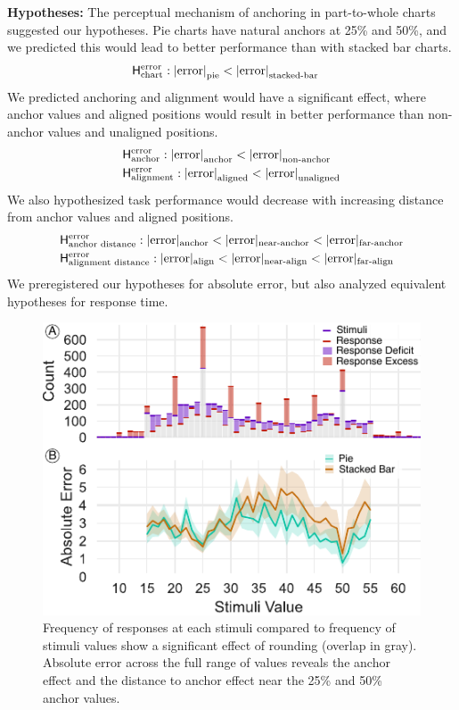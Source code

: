 \documentclass[preprint]{vgtc}               %
\newcommand{\FlatCircledText}[1]{\smash{\CircledText{#1}}}
\begin{document}
\textbf{Hypotheses:}
The perceptual mechanism of anchoring in part-to-whole charts suggested our hypotheses. 
Pie charts have  natural anchors at 25\% and 50\%, and we predicted this would lead to better performance than with stacked bar charts.
\begin{align}
    &\mathsf{H}^\text{error}_\text{chart} : \left|\text{error}\right|_\text{pie} < \left|\text{error}\right|_\text{stacked-bar} \notag
\end{align}
We predicted anchoring and alignment would have a significant effect, where anchor values and aligned positions would result in better performance than non-anchor values and unaligned positions.
\begin{align}
    &\mathsf{H}^\text{error}_\text{anchor} : \left|\text{error}\right|_\text{anchor} < \left|\text{error}\right|_\text{non-anchor} \notag \\
    &\mathsf{H}^\text{error}_\text{alignment} : \left|\text{error}\right|_\text{aligned} < \left|\text{error}\right|_\text{unaligned} \notag
\end{align}
We also hypothesized task performance would decrease with increasing distance from anchor values and aligned positions.
\begin{align}
    &\mathsf{H}^\text{error}_\text{anchor distance} : |\text{error}|_\text{anchor} < |\text{error}|_\text{near-anchor} < |\text{error}|_\text{far-anchor} \notag \\
    &\mathsf{H}^\text{error}_\text{alignment distance} : |\text{error}|_\text{align} < |\text{error}|_\text{near-align} < |\text{error}|_\text{far-align} \notag
\end{align}
We preregistered our hypotheses for absolute error, but also analyzed equivalent hypotheses for response time.
\begin{figure}[tb]
    \centering
    \includegraphics[width=\columnwidth]{responsesFigure.pdf}
    \caption{\FlatCircledText{A} Frequency of responses at each stimuli compared to frequency of stimuli values show a significant effect of rounding (overlap in gray). \FlatCircledText{B}Absolute error across the full range of values reveals the anchor effect and the distance to anchor effect near the 25\% and 50\% anchor values.}
    \label{fig:responses}
\end{figure}
\end{document}
